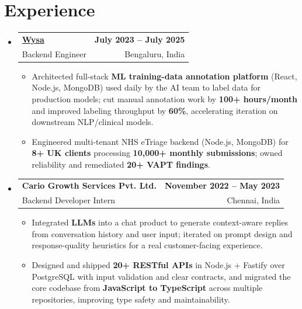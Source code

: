 \documentclass[letterpaper,10pt]{article}
\makeatletter
\newcommand{\resumeItem}[1]{
  \item\small{#1\vspace{-1pt}}
}
\newcommand{\resumeSubheading}[4]{
  \vspace{1pt}\item
    \begin{tabular*}{0.985\textwidth}[t]{l@{\extracolsep{\fill}}r}
      \textbf{#1} & \textbf{\small #2} \\
      {\small\color{ResumeSlate} #3} & {\small\color{ResumeSlate} #4} \\
    \end{tabular*}\vspace{-6pt}
}
\newcommand{\resumeSubHeadingListStart}{\begin{itemize}[leftmargin=0.0in, label={}, itemsep=2pt, topsep=2pt]}
\newcommand{\resumeSubHeadingListEnd}{\end{itemize}}
\newcommand{\resumeItemListStart}{\begin{itemize}[leftmargin=0.18in, itemsep=2pt, topsep=1pt]}
\newcommand{\resumeItemListEnd}{\end{itemize}\vspace{-4pt}}
\makeatother
\begin{document}
\section{Experience}
\resumeSubHeadingListStart
  \resumeSubheading
    {\href{https://www.wysa.io}{Wysa}}{July 2023 -- July 2025}
    {Backend Engineer}{Bengaluru, India}
    \resumeItemListStart
      \resumeItem{Architected full-stack \textbf{ML training-data annotation platform} (React, Node.js, MongoDB) used daily by the AI team to label data for production models; cut manual annotation work by \textbf{100+ hours/month} and improved labeling throughput by \textbf{60\%}, accelerating iteration on downstream NLP/clinical models.}
      \resumeItem{Engineered multi-tenant NHS eTriage backend (Node.js, MongoDB) for \textbf{8+ UK clients} processing \textbf{10{,}000+ monthly submissions}; owned reliability and remediated \textbf{20+ VAPT findings}.}
    \resumeItemListEnd
  \resumeSubheading
    {Cario Growth Services Pvt. Ltd.}{November 2022 -- May 2023}
    {Backend Developer Intern}{Chennai, India}
    \resumeItemListStart
      \resumeItem{Integrated \textbf{LLMs} into a chat product to generate context-aware replies from conversation history and user input; iterated on prompt design and response-quality heuristics for a real customer-facing experience.}
      \resumeItem{Designed and shipped \textbf{20+ RESTful APIs} in Node.js + Fastify over PostgreSQL with input validation and clear contracts, and migrated the core codebase from \textbf{JavaScript to TypeScript} across multiple repositories, improving type safety and maintainability.}
    \resumeItemListEnd
\resumeSubHeadingListEnd
\vspace{-4pt}
\end{document}
